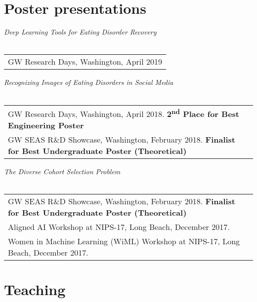 \documentclass[a4paper,10pt]{article}
\begin{document}
\section{Poster presentations}

\begin{compactitem}\itemsep=0.1cm
\item \emph{
Deep Learning Tools for Eating Disorder Recovery}\\
  ~\begin{tabular}{@{~$\bullet$~~}l}
  GW Research Days, Washington, April 2019
  \end{tabular}
  \subitem
\end{compactitem}
%
\begin{compactitem}\itemsep=0.1cm
\item \emph{
Recognizing Images of Eating Disorders in Social Media}\\
  ~\begin{tabular}{@{~$\bullet$~~}l}
  GW Research Days, Washington, April 2018. \textbf{2\textsuperscript{nd} Place for Best Engineering Poster} \\
  GW SEAS R\&D Showcase, Washington, February 2018. \textbf{Finalist for Best Undergraduate Poster (Theoretical)}\\
  \end{tabular}
  \subitem
\end{compactitem}

\begin{compactitem}\itemsep=0.1cm
\item \emph{
The Diverse Cohort Selection Problem}\\
~\begin{tabular}{@{~$\bullet$~~}l}
  GW SEAS R\&D Showcase, Washington, February 2018. \textbf{Finalist for Best Undergraduate Poster (Theoretical)}\\
  Aligned AI Workshop at NIPS-17, Long Beach, December 2017.\\
  Women in Machine Learning (WiML) Workshop at NIPS-17, Long Beach, December 2017.
  \end{tabular}
\end{compactitem}

\section{Teaching}
\end{document}
